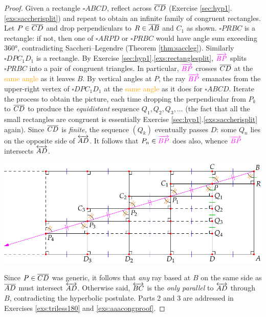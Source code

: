 \begin{proof}
	Given a rectangle $\square ABCD$, reflect across $\overline{CD}$ (Exercise \ref*{sec:hyp1}.\ref{exs:saccherisplit}) and repeat to obtain an infinite family of congruent rectangles. Let $P\in\overline{CD}$ and drop perpendiculars to $R\in\overline{AB}$ and $C_1$ as shown.\smallbreak
	$\square PRBC$ is a rectangle: if not, then one of $\square ARPD$ or $\square PRBC$ would have angle sum exceeding \ang{360}, contradicting Saccheri--Legendre (Theorem \ref{thm:saccleg}). Similarly $\square DPC_1D_1$ is a rectangle.\smallbreak
	By Exercise \ref*{sec:hyp1}.\ref{exs:rectanglesplit}, $\textcolor{Magenta}{\ray{BP}}$ splits $\square PRBC$ into a pair of congruent triangles. In particular, $\textcolor{Magenta}{\ray{BP}}$ crosses $\overline{CD}$ at the \textcolor{orange}{same angle} as it leaves $B$. By vertical angles at $P$, the ray $\textcolor{Magenta}{\ray{BP}}$ emanates from the upper-right vertex of $\square DPC_1D_1$ at the \textcolor{orange}{same angle} as it does for $\square ABCD$.\smallbreak
	Iterate the process to obtain the picture, each time dropping the perpendicular from $P_k$ to $\overline{CD}$ to produce the \emph{equidistant} sequence $Q_1,Q_2,Q_3,\ldots$ (the fact that all the small rectangles are congruent is essentially Exercise \ref*{sec:hyp1}.\ref{exs:saccherisplit} again). Since $\overline{CD}$ is \emph{finite,} the sequence $(Q_k)$ eventually\footnotemark{} passes $D$: some $Q_n$ lies on the opposite side of $\overleftrightarrow{AD}$. It follows that $P_n\in\textcolor{Magenta}{\ray{BP}}$ does also, whence $\textcolor{Magenta}{\ray{BP}}$ intersects $\overleftrightarrow{AD}$.
	\begin{center}
		\includegraphics[scale=0.95]{basic-rect4}\vspace{-4pt}
	\end{center}
	Since $P\in\overline{CD}$ was generic, it follows that \emph{any} ray based at $B$ on the same side as $\overline{AD}$ must intersect $\overleftrightarrow{AD}$. Otherwise said, $\overleftrightarrow{BC}$ is the \emph{only parallel} to $\overleftrightarrow{AD}$ through $B$, contradicting the hyperbolic postulate.\smallbreak
	Parts 2 and 3 are addressed in Exercises \ref{exs:triless180} and \ref{exs:aaacongproof}.
\end{proof}

